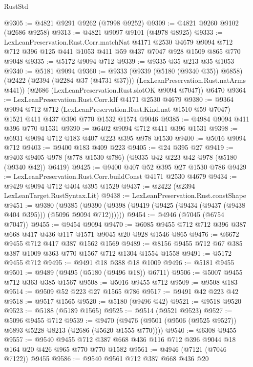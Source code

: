\begin{lexlean}{RustStd}
\begin{coremodule}
@9305 := @4821 @9291 @9262 (@7998 @9252)
@9309 := @4821 @9260 @9102 (@2686 @9258)
@9313 := @4821 @9097 @9101 (@4978 @8925)
@9333 := LexLeanPreservation.Rust.Corr.matchNat
    @4171
    @2530
    @4679
    @9094
    @712
    @712
    @396
    @125
    @441
    @1053
    @411
    @59
    @437
    @7047
    @928
    @1509
    @865
    @770
    @9048
@9335 := @5172 @9094 @712
@9339 := @9335 @35 @213 @35 @1053
@9340 := @5181 @9094
@9360 := @9333
    (@9339 (@5180 (@9340 @35)) @6858)
    (@2422 (@2394 (@2284 @37 (@4731 @37))) (LexLeanPreservation.Rust.natArms @441))
    (@2686 (LexLeanPreservation.Rust.slotOK @9094 @7047))
    @6470
@9364 := LexLeanPreservation.Rust.Corr.kIf @4171 @2530 @4679
@9380 := @9364
    @9094
    @712
    @712
    (LexLeanPreservation.Rust.Kind.nat @1510 @59 @7047)
    @1521
    @411
    @437
    @396
    @770
    @1532
    @1574
    @9046
@9385 := @4984 @9094 @411 @396 @770 @1531
@9390 := @6402 @9094 @712 @411 @396 @1531
@9398 := @6931 @9094 @712 @183 @407 @223 @395 @978 @1530
@9400 := @5016 @9094 @712
@9403 := @9400 @183 @409 @223
@9405 := @24 @395 @27
@9419 := @9403 @9405 @978 (@778 @1530 @786) (@9335 @42 @223 @42 @978 (@5180 (@9340 @42)) @6419)
@9425 := @9400 @407 @52 @395 @27 @1530 @786
@9429 := LexLeanPreservation.Rust.Corr.buildConst @4171 @2530 @4679
@9434 := @9429 @9094 @712 @404 @395 @1529
@9437 := @2422 (@2394 LexLeanTarget.RustSyntax.Lit)
@9438 := LexLeanPreservation.Rust.constShape
@9451 := @9380
    (@9385 (@9390 (@9398 (@9419 (@9425 (@9434 (@9437 (@9438 @404 @395))) (@5096 @9094 @712))))))
@9454 := @4946 (@7045 (@6754 @7047))
@9455 := @9454 @9094
@9470 := @6085 @9455 @712 @712 @396 @387 @668 @417 @436 @117 @1571 @9045 @20 @928 @1546 @865
@9476 := @6672 @9455 @712 @417 @387 @1562 @1569
@9489 := @8156 @9455 @712 @67 @385 @387 @1009 @363 @770 @1567 @712 @1304 @1554 @1558
@9491 := @5172 @9455 @712
@9495 := @9491 @18 @388 @18 @1009
@9496 := @5181 @9455
@9501 := @9489 (@9495 (@5180 (@9496 @18)) @6711)
@9506 := @5007 @9455 @712 @363 @385 @1567
@9508 := @5016 @9455 @712
@9509 := @9508 @183
@9514 := @9509 @52 @223 @27 @1565 @786
@9517 := @9491 @42 @223 @42
@9518 := @9517 @1565
@9520 := @5180 (@9496 @42)
@9521 := @9518 @9520
@9523 := @5188 (@5189 @1565)
@9525 := @9514 (@9521 @9523)
@9527 := @5096 @9455 @712
@9539 := @9470 (@9476 (@9501 (@9506 (@9525 @9527)) @6893 @5228 @8213 (@2686 (@5620 @1555 @770))))
@9540 := @6308 @9455
@9557 := @9540 @9455 @712 @387 @668 @436 @116 @712 @396 @9044 @18 @164 @20 @426 @965 @770 @770 @1582
@9561 := @4946 (@7121 (@7046 @7122)) @9455
@9586 := @9540
    @9561
    @712
    @387
    @668
    @436
    @20

\end{coremodule}
\end{lexlean}
